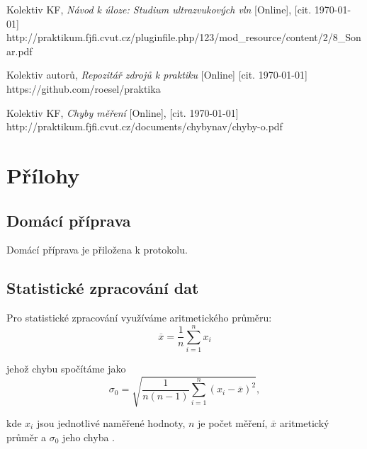 \documentclass[english]{article}
\begin{document}
\begin{thebibliography}{9}
 Kolektiv KF, \emph{Návod k úloze: Studium ultrazvukových vln} [Online], [cit. \today] \newline 
http://praktikum.fjfi.cvut.cz/pluginfile.php/123/mod\_resource/content/2/8\_Sonar.pdf

 Kolektiv autorů, \emph{Repozitář zdrojů k praktiku} [Online] [cit. \today] \newline https://github.com/roesel/praktika


 Kolektiv KF, \emph{Chyby měření} [Online], [cit. \today] \newline http://praktikum.fjfi.cvut.cz/documents/chybynav/chyby-o.pdf

\end{thebibliography}
\endgroup

\section{Přílohy}

\subsection{Domácí příprava}
	Domácí příprava je přiložena k protokolu.

\subsection{Statistické zpracování dat}
	Pro statistické zpracování využíváme aritmetického průměru:
	\begin{equation} \label{eq:aritmeticky_prumer}
	\overline{x} = \frac{1}{n}\sum\limits_{i=1}^{n}x_i
	\end{equation}
	
	jehož chybu spočítáme jako 
	\begin{equation} \label{eq:chyba_aritmetickeho_prumeru}
	\sigma_0 = \sqrt{\frac{1}{n(n-1)} \sum\limits_{i=1}^{n}\left( x_i - \overline{x} \right)^2 },
	\end{equation}
	
	kde $ x_i $ jsou jednotlivé naměřené hodnoty, $ n $ je počet měření, $ \overline{x} $ aritmetický průměr a $ \sigma_0 $ jeho chyba \cite{bib:chyby}.
	
\end{document}
